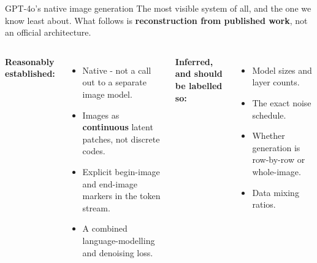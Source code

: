 \documentclass[aspectratio=169]{beamer}
\begin{document}
\begin{frame}{GPT-4o's native image generation}
  \small
  The most visible system of all, and the one we know least about. What follows is
  \textbf{reconstruction from published work}, not an official architecture.
  \vskip 6pt
  \begin{columns}[T]
    \footnotesize
    \textbf{Reasonably established:}
    \begin{itemize}\itemsep 2pt
      \item Native - not a call out to a separate image model.
      \item Images as \textbf{continuous} latent patches, not discrete codes.
      \item Explicit begin-image and end-image markers in the token stream.
      \item A combined language-modelling and denoising loss.
    \end{itemize}
    \footnotesize
    \textbf{Inferred, and should be labelled so:}
    \begin{itemize}\itemsep 2pt
      \item Model sizes and layer counts.
      \item The exact noise schedule.
      \item Whether generation is row-by-row or whole-image.
      \item Data mixing ratios.
    \end{itemize}
  \end{columns}
  \vskip 8pt
\end{frame}
\end{document}
